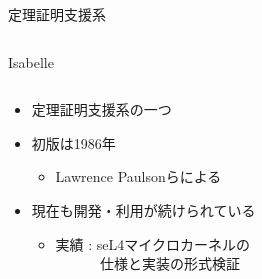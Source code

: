 \documentclass[17pt,aspectratio=169]{beamer}
\begin{document}
\begin{frame}{定理証明支援系}
\begin{columns}
\begin{column}{0.35\textwidth}
        \end{column}
    \end{columns}


\end{frame}


\begin{frame}{Isabelle}
    \begin{columns}
        \begin{column}{0.75\textwidth}
            \begin{itemize}
                \item 定理証明支援系の一つ
                \item 初版は1986年
                      {\small \begin{itemize}
                          \item Lawrence Paulsonらによる
                      \end{itemize} }
                \item 現在も開発・利用が続けられている
                      {\small \begin{itemize}
                          \item 実績 : seL4マイクロカーネルの\\
                                \,\,\,\,\,\,\,\,\,\,\,\,\,\,\,\,\,
                                仕様と実装の形式検証
                      \end{itemize} }

            \end{itemize}


\end{column}
\end{columns}
\end{frame}
\end{document}
